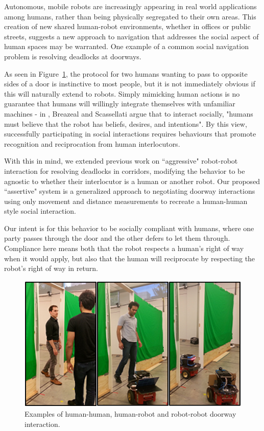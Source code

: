 \documentclass[letterpaper, 10 pt, conference]{ieeeconf}  %
\begin{document}
Autonomous, mobile robots are increasingly appearing in real world applications among humans, rather than being physically segregated to their own areas. This creation of new shared human-robot environments, whether in offices or public streets, suggests a new approach to navigation that addresses the social aspect of human spaces may be warranted. One example of a common social navigation problem is resolving deadlocks at doorways. 

As seen in Figure~\ref{fig:Triptych}, the protocol for two humans wanting to pass to opposite sides of a door is instinctive to most people, but it is not immediately obvious if this will naturally extend to robots. Simply mimicking human actions is no guarantee that humans will willingly integrate themselves with unfamiliar machines - in \cite{c0}, Breazeal and Scassellati argue that to interact socially, "humans must believe that the robot has beliefs, desires, and intentions". By this view, successfully participating in social interactions requires behaviours that promote recognition and reciprocation from human interlocutors.

With this in mind, we extended previous work on ``aggressive" robot-robot interaction\cite{c1} for resolving deadlocks in corridors, modifying the behavior to be agnostic to whether their interlocutor is a human or another robot. Our proposed ``assertive" system is a generalized approach to negotiating doorway interactions using only movement and distance measurements to recreate a human-human style social interaction.

Our intent is for this behavior to be socially compliant with humans, where one party passes through the door and the other defers to let them through. Compliance here means both that the robot respects a human's right of way when it would apply, but also that the human will reciprocate by respecting the robot's right of way in return. 

   \begin{figure}
      \centering
      \includegraphics[scale=0.5]{Triptych.png}
      \caption{Examples of human-human, human-robot and robot-robot doorway interaction.}
      \label{fig:Triptych}
   \end{figure}
\end{document}
